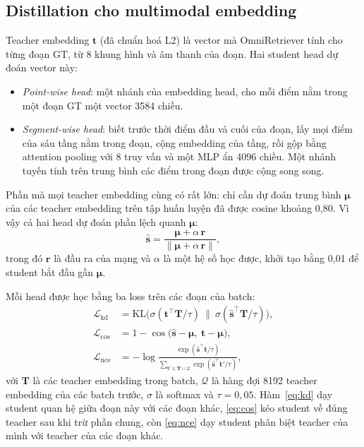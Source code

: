 \documentclass{IEEEtran}
\begin{document}
\subsection{Distillation cho multimodal embedding}
Teacher embedding $\mathbf{t}$ (đã chuẩn hoá L2) là vector mà OmniRetriever tính cho từng đoạn GT, từ 8 khung hình và âm thanh của đoạn. Hai student head dự đoán vector này:
\begin{itemize}
\item \emph{Point-wise head}: một nhánh của embedding head, cho mỗi điểm nằm trong một đoạn GT một vector 3584 chiều.
\item \emph{Segment-wise head}: biết trước thời điểm đầu và cuối của đoạn, lấy mọi điểm của sáu tầng nằm trong đoạn, cộng embedding của tầng, rồi gộp bằng attention pooling với 8 truy vấn và một MLP ẩn 4096 chiều. Một nhánh tuyến tính trên trung bình các điểm trong đoạn được cộng song song.
\end{itemize}
Phần mà mọi teacher embedding cùng có rất lớn: chỉ cần dự đoán trung bình $\boldsymbol{\mu}$ của các teacher embedding trên tập huấn luyện đã được cosine khoảng 0,80. Vì vậy cả hai head dự đoán phần lệch quanh $\boldsymbol{\mu}$:
\begin{equation}
\label{eq:dev}
\hat{\mathbf{s}} = \frac{\boldsymbol{\mu} + \alpha\,\mathbf{r}}{\lVert \boldsymbol{\mu} + \alpha\,\mathbf{r} \rVert},
\end{equation}
trong đó $\mathbf{r}$ là đầu ra của mạng và $\alpha$ là một hệ số học được, khởi tạo bằng 0,01 để student bắt đầu gần $\boldsymbol{\mu}$.

Mỗi head được học bằng ba loss trên các đoạn của batch:
\begin{align}
\mathcal{L}_{\mathrm{kd}} &= \mathrm{KL}\big(\sigma(\mathbf{t}^{\top}\mathbf{T}/\tau)\ \big\|\ \sigma(\hat{\mathbf{s}}^{\top}\mathbf{T}/\tau)\big), \label{eq:kd}\\
\mathcal{L}_{\mathrm{cos}} &= 1 - \cos\big(\hat{\mathbf{s}} - \boldsymbol{\mu},\ \mathbf{t} - \boldsymbol{\mu}\big), \label{eq:cos}\\
\mathcal{L}_{\mathrm{nce}} &= -\log \frac{\exp(\hat{\mathbf{s}}^{\top}\mathbf{t}/\tau)}{\sum_{\mathbf{t}' \in \mathbf{T} \cup \mathcal{Q}} \exp(\hat{\mathbf{s}}^{\top}\mathbf{t}'/\tau)}, \label{eq:nce}
\end{align}
với $\mathbf{T}$ là các teacher embedding trong batch, $\mathcal{Q}$ là hàng đợi 8192 teacher embedding của các batch trước, $\sigma$ là softmax và $\tau = 0{,}05$. Hàm~\eqref{eq:kd} dạy student quan hệ giữa đoạn này với các đoạn khác, \eqref{eq:cos} kéo student về đúng teacher sau khi trừ phần chung, còn \eqref{eq:nce} dạy student phân biệt teacher của mình với teacher của các đoạn khác.
\end{document}
